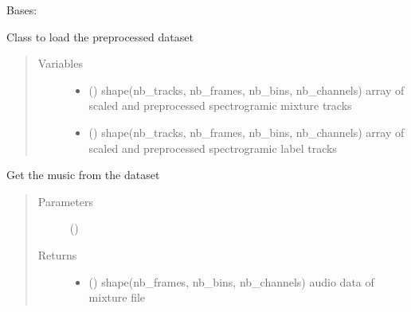 \documentclass[letterpaper,10pt,english,openany,oneside]{sphinxmanual}
\begin{document}
\begin{fulllineitems}
\label{\detokenize{docs/source/dataset:dataset.Dataset}}
Bases: 

Class to load the preprocessed dataset
\begin{quote}\begin{description}
\item[{Variables}] \leavevmode\begin{itemize}
\item {} 
 () \textendash{} shape(nb\_tracks, nb\_frames, nb\_bins, nb\_channels)
array of scaled and preprocessed spectrogramic mixture tracks

\item {} 
 () \textendash{} shape(nb\_tracks, nb\_frames, nb\_bins, nb\_channels)
array of scaled and preprocessed spectrogramic label tracks

\end{itemize}

\end{description}\end{quote}

\begin{fulllineitems}
\label{\detokenize{docs/source/dataset:dataset.Dataset.__getitem__}}
Get the music from the dataset
\begin{quote}\begin{description}
\item[{Parameters}] \leavevmode
{} () \textendash{} 

\item[{Returns}] \leavevmode
\begin{itemize}
\item {} 
 () \textendash{} shape(nb\_frames, nb\_bins, nb\_channels)
audio data of mixture file


\end{itemize}
\end{description}
\end{quote}
\end{fulllineitems}
\end{fulllineitems}
\end{document}
